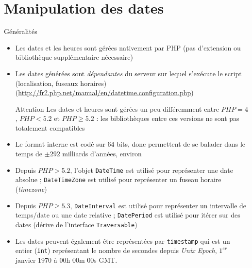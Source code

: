 
\section{Manipulation des dates}

\begin{frame}{Généralités}
	\begin{itemize}
		\item Les dates et les heures sont gérées nativement par PHP (pas d’extension ou bibliothèque supplémentaire nécessaire)
		\item Les dates générées sont \emph{dépendantes} du serveur sur lequel s’exécute le script (localisation, fuseaux horaires) (\url{http://fr2.php.net/manual/en/datetime.configuration.php})
		\begin{alertblock}{Attention}
			Les dates et heures sont gérées un peu différemment entre $PHP=4$, $PHP<5.2$ et $PHP\ge5.2$ : les bibliothèques entre ces versions ne sont pas totalement compatibles
		\end{alertblock}
		\item Le format interne est codé sur 64 bits, donc permettent de se balader dans le temps de $\pm292$ milliards d’années, environ
		\item Depuis $PHP\gt5.2$, l’objet \texttt{DateTime} est utilisé pour représenter une date absolue ; \texttt{DateTimeZone} est utilisé pour représenter un fuseau horaire (\textit{timezone})
		\item Depuis $PHP\ge5.3$, \texttt{DateInterval} est utilisé pour représenter un intervalle de temps/date ou une date relative ; \texttt{DatePeriod} est utilisé pour itérer sur des dates (dérive de l’interface \texttt{Traversable})
		\item Les dates peuvent également être représentées par \texttt{timestamp} qui est un entier (\texttt{int}) représentant le nombre de secondes depuis \textit{Unix Epoch}, $1^{er}$ janvier 1970 à 00h 00m 00s GMT.
	\end{itemize}
\end{frame}

